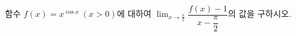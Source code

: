 함수 $f(x)=x^{\cos x}\ (x>0)$에 대하여 $\displaystyle\lim_{x\to\frac{\pi}{2}}\dfrac{f(x)-1}{x-\dfrac{\pi}{2}}$의 값을 구하시오.
